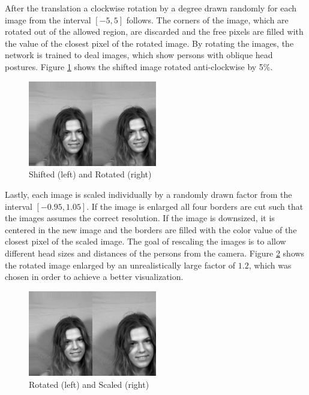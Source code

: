 \documentclass[11pt, a4paper]{article}
\begin{document}
After the translation a clockwise rotation by a degree drawn randomly for each image from the interval $[-5,5]$ follows. The corners of the image, which are rotated out of the allowed region, are discarded and the free pixels are filled with the value of the closest pixel of the rotated image. By rotating the images, the network is trained to deal images, which show persons with oblique head postures. Figure \ref{fig:shifted_rotated} shows the shifted image rotated anti-clockwise by 5\%.

\begin{figure}[htbp]
	\centering
	\includegraphics[width=0.5\textwidth]{shifted_rotated.png}
	\caption{Shifted (left) and Rotated (right)}
	\label{fig:shifted_rotated}
\end{figure}

Lastly, each image is scaled individually by a randomly drawn factor from the interval $[-0.95,1.05]$. If the image is enlarged all four borders are cut such that the images assumes the correct resolution. If the image is downsized, it is centered in the new image and the borders are filled with the color value of the closest pixel of the scaled image. The goal of rescaling the images is to allow different head sizes and distances of the persons from the camera. Figure \ref{fig:rotated_scaled} shows the rotated image enlarged by an unrealistically large factor of $1.2$, which was chosen in order to achieve a better visualization.

\begin{figure}[htbp]
	\centering
	\includegraphics[width=0.5\textwidth]{rotated_scaled.png}
	\caption{Rotated (left) and Scaled (right)}
	\label{fig:rotated_scaled}
\end{figure}
\end{document}
